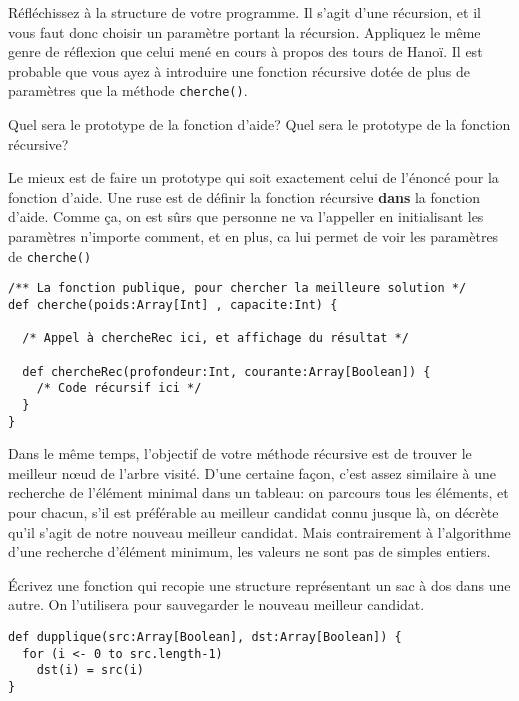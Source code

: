 \documentclass[10pt]{article}\usepackage[nu]{esial}
\begin{document}
\medskip Réfléchissez à la structure de votre programme. Il s'agit d'une
récursion, et il vous faut donc choisir un paramètre portant la
récursion. Appliquez le même genre de réflexion que celui mené en cours à
propos des tours de Hanoï. Il est probable que vous ayez à introduire une
fonction récursive dotée de plus de paramètres que la méthode
\texttt{cherche()}.

\Question Quel sera le prototype de la fonction d'aide? Quel sera le prototype
de la fonction récursive?

\begin{Reponse}
  Le mieux est de faire un prototype qui soit exactement celui de l'énoncé pour
  la fonction d'aide. Une ruse est de définir la fonction récursive
  \textbf{dans} la fonction d'aide. Comme ça, on est sûrs que personne ne va
  l'appeller en initialisant les paramètres n'importe comment, et en plus, ca
  lui permet de voir les paramètres de \texttt{cherche()}
  \begin{Verbatim}
/** La fonction publique, pour chercher la meilleure solution */
def cherche(poids:Array[Int] , capacite:Int) {

  /* Appel à chercheRec ici, et affichage du résultat */
  
  def chercheRec(profondeur:Int, courante:Array[Boolean]) {
    /* Code récursif ici */
  }
}    
  \end{Verbatim}
\end{Reponse}

\medskip Dans le même temps, l'objectif de votre méthode récursive est de
trouver le meilleur nœud de l'arbre visité. D'une certaine façon, c'est assez
similaire à une recherche de l'élément minimal dans un tableau: on parcours tous
les éléments, et pour chacun, s'il est préférable au meilleur candidat connu
jusque là, on décrète qu'il s'agit de notre nouveau meilleur candidat. Mais
contrairement à l'algorithme d'une recherche d'élément minimum, les valeurs ne
sont pas de simples entiers. 

\Question Écrivez une fonction qui recopie une structure représentant un sac à
dos dans une autre. On l'utilisera pour sauvegarder le nouveau meilleur
candidat.

\begin{Reponse}
  \begin{Verbatim}
def dupplique(src:Array[Boolean], dst:Array[Boolean]) {
  for (i <- 0 to src.length-1) 
    dst(i) = src(i)
}    
  \end{Verbatim}
\end{Reponse}
\end{document}
